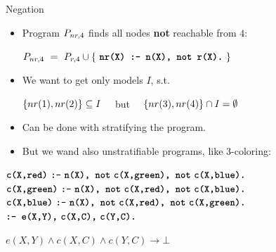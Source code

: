 \documentclass{beamer}
\begin{document}
\begin{frame}{Negation}
	\onslide<+->
	
	\begin{itemize}
		\item Program $P_{nr,4}$ finds all nodes \textbf{not} reachable from $4$:
			\begin{center}
				$\prog_{nr,4} \ = \ \prog_{r,4} \cup \set{\ \code{nr(X) :- n(X), not r(X).}\ }$
			\end{center}
		
		\item We want to get only models $I$, s.t.
			\begin{center}
				$\left\{{nr(1), nr(2)}\right\}\subseteq I\quad$ but $\quad\left\{{nr(3), nr(4)}\right\}\cap I = \emptyset$
			\end{center}
		
		\item Can be done with stratifying the program.
		
		\onslide<+->
		
		\item But we wand also unstratifiable programs, like 3-coloring:
		
	\end{itemize}
	
	$\texttt{\bfseries{c(X,red)}}\ \texttt{\bfseries{:-}}\ \texttt{\bfseries{n(X), not}}\ \texttt{\bfseries{c(X,green), not}}\ \texttt{\bfseries{c(X,blue).}}$\\
	$\texttt{\bfseries{c(X,green)}}\ \texttt{\bfseries{:-}}\ \texttt{\bfseries{n(X), not}}\ \texttt{\bfseries{c(X,red), not}}\ \texttt{\bfseries{c(X,blue).}}$\\
	$\texttt{\bfseries{c(X,blue)}}\ \texttt{\bfseries{:-}}\ \texttt{\bfseries{n(X), not}}\ \texttt{\bfseries{c(X,red), not}}\ \texttt{\bfseries{c(X,green).}}$\\
	$\code{:- e(X,Y),}\ \code{c(X,C),}\ \code{c(Y,C).}$
	
	\hspace{1cm}
	{\tiny\color{black!50} $e(X,Y) \wedge c(X,C) \wedge c(Y,C) \rightarrow \bot$}
	
\end{frame}
\end{document}
